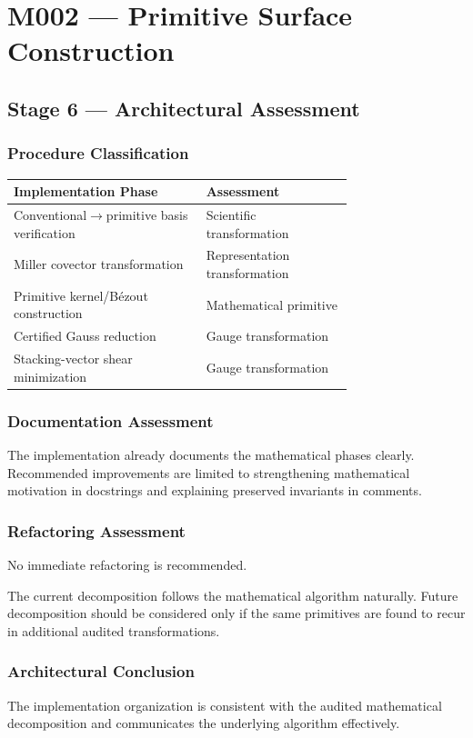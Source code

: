 
\chapter{M002 --- Primitive Surface Construction}

\section{Stage 6 --- Architectural Assessment}

\subsection{Procedure Classification}

\begin{center}
\begin{tabular}{|p{0.42\linewidth}|p{0.32\linewidth}|}
\hline
Implementation Phase & Assessment\\
\hline
Conventional$\rightarrow$primitive basis verification & Scientific transformation\\
Miller covector transformation & Representation transformation\\
Primitive kernel/B\'ezout construction & Mathematical primitive\\
Certified Gauss reduction & Gauge transformation\\
Stacking-vector shear minimization & Gauge transformation\\
\hline
\end{tabular}
\end{center}

\subsection{Documentation Assessment}

The implementation already documents the mathematical phases clearly.
Recommended improvements are limited to strengthening mathematical
motivation in docstrings and explaining preserved invariants in comments.

\subsection{Refactoring Assessment}

No immediate refactoring is recommended.

The current decomposition follows the mathematical algorithm naturally.
Future decomposition should be considered only if the same primitives are
found to recur in additional audited transformations.

\subsection{Architectural Conclusion}

The implementation organization is consistent with the audited
mathematical decomposition and communicates the underlying algorithm
effectively.
